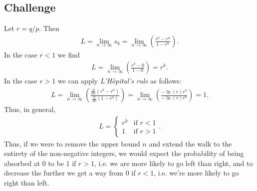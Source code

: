 \documentclass{article}
\begin{document}
\subsection*{Challenge}

Let $r=q/p$. Then
\begin{align*}
  L = \lim_{n\to\infty} s_k =
  \lim_{n\to\infty}\left(\frac{r^k-r^n}{1-r^n}\right).
\end{align*}
In the case $r<1$ we find
\begin{align*}
  L = \lim_{n\to\infty}\left(\frac{r^k-0}{1-0}\right) = r^k.
\end{align*}
In the case $r>1$ we can apply \emph{L'H\^opital's rule} as follows:
\begin{align*}
  L = \lim_{n\to\infty}\left(\frac{\frac{d}{dn}(r^k-r^n)}{\frac{d}{dn}(1-r^n)}\right)
  = \lim_{n\to\infty}\left(\frac{-\ln(r)r^n}{-\ln(r)r^n}\right)=1.
\end{align*}
Thus, in general,
\begin{align*}
  L = \begin{cases}
    r^k & \text{if }r<1 \\
    1   & \text{if }r>1
  \end{cases}.
\end{align*}
Thus, if we were to remove the upper bound $n$ and extend the walk to the entirety
of the non-negative integers, we would expect the probability of being
absorbed at $0$ to be $1$ if $r>1$, i.e. we are more likely to go left
than right, and to decrease the further we get a way from $0$ if $r<1$,
i.e. we're more likely to go right than left.
\end{document}
